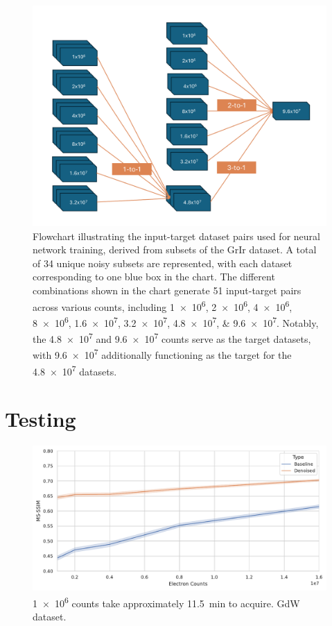 \begin{figure}[h]
    \centering
    \includegraphics[width=1\linewidth]{images/training_flowchart.pdf}
    \caption{Flowchart illustrating the input-target dataset pairs used for neural network training, derived from subsets of the \gls{GrIr} dataset. A total of \num{34} unique noisy subsets are represented, with each dataset corresponding to one blue box in the chart. The different combinations shown in the chart generate \num{51} input-target pairs across various counts, including \numlist{1e6;2e6;4e6;8e6;1.6e7;3.2e7;4.8e7;9.6e7}. Notably, the \num{4.8e7} and \num{9.6e7} counts serve as the target datasets, with \num{9.6e7} additionally functioning as the target for the \num{4.8e7} datasets.}
    \label{fig:training-data}
\end{figure}

\section{Testing}
\begin{figure}[h]
    \centering
    \includegraphics[width=1\linewidth]{images/nn_gdw_msssim.pdf}
    \caption{\num{1e6} counts take approximately \qty{11.5}{min} to acquire. \gls{GdW} dataset.}
    \label{fig:gdw-test-metirc}
\end{figure}